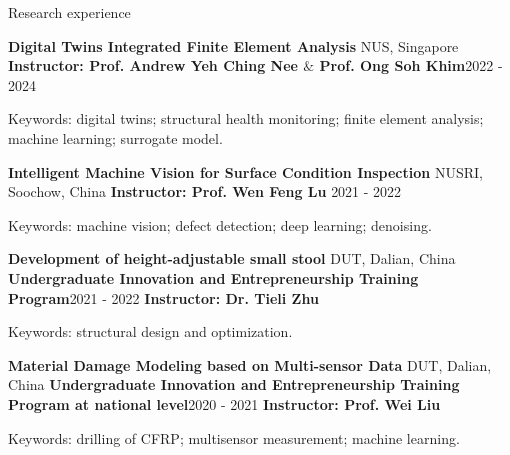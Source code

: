 \documentclass{resume} %
\begin{document}
\begin{rSection}{Research experience}
\begin{rSubsection}{\bf Digital Twins Integrated Finite Element Analysis  }{NUS, Singapore}
	{\bf Instructor: Prof. Andrew Yeh Ching Nee $\&$  Prof. Ong Soh Khim}{2022 - 2024}
	\item {Keywords: digital twins; structural health monitoring; finite element analysis; machine learning; surrogate model.}\\
\end{rSubsection}

\begin{rSubsection}{\bf Intelligent Machine Vision for Surface Condition Inspection  }{NUSRI, Soochow, China}
{\bf Instructor: Prof. Wen Feng Lu  }{2021 - 2022}
	\item {Keywords: machine vision; defect detection; deep learning; denoising.}\\
\end{rSubsection}

\begin{rSubsubsection}{\bf Development of height-adjustable small stool  }{DUT, Dalian, China}
{\bf Undergraduate Innovation and Entrepreneurship Training Program}{2021 - 2022}
{\bf Instructor: Dr. Tieli Zhu}{ }
	\item {Keywords: structural design and optimization.}\\
\end{rSubsubsection}


\begin{rSubsubsection}{\bf Material Damage Modeling based on Multi-sensor Data  }{DUT, Dalian, China}
	{\bf Undergraduate Innovation and Entrepreneurship Training Program at national level}{2020 - 2021}
	{\bf Instructor: Prof. Wei Liu}{ }
	\item {Keywords: drilling of CFRP; multisensor measurement; machine learning.}\\
\end{rSubsubsection}
\end{rSection}
\end{document}
